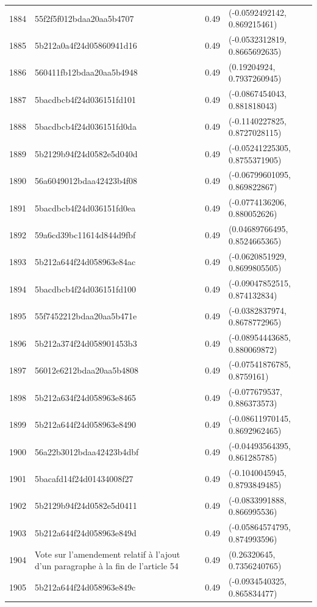 \begin{table}[ht]
\begin{tabular}{rlrl}
  1884 & 55f2f5f012bdaa20aa5b4707 & 0.49 & (-0.0592492142, 0.869215461) \\ 
  1885 & 5b212a0a4f24d05860941d16 & 0.49 & (-0.0532312819, 0.8665692635) \\ 
  1886 & 560411fb12bdaa20aa5b4948 & 0.49 & (0.19204924, 0.7937260945) \\ 
  1887 & 5bacdbcb4f24d036151fd101 & 0.49 & (-0.0867454043, 0.881818043) \\ 
  1888 & 5bacdbcb4f24d036151fd0da & 0.49 & (-0.1140227825, 0.8727028115) \\ 
  1889 & 5b2129b94f24d0582e5d040d & 0.49 & (-0.05241225305, 0.8755371905) \\ 
  1890 & 56a6049012bdaa42423b4f08 & 0.49 & (-0.06799601095, 0.869822867) \\ 
  1891 & 5bacdbcb4f24d036151fd0ea & 0.49 & (-0.0774136206, 0.880052626) \\ 
  1892 & 59a6cd39bc11614d844d9fbf & 0.49 & (0.04689766495, 0.8524665365) \\ 
  1893 & 5b212a644f24d058963e84ac & 0.49 & (-0.0620851929, 0.8699805505) \\ 
  1894 & 5bacdbcb4f24d036151fd100 & 0.49 & (-0.09047852515, 0.874132834) \\ 
  1895 & 55f7452212bdaa20aa5b471e & 0.49 & (-0.0382837974, 0.8678772965) \\ 
  1896 & 5b212a374f24d058901453b3 & 0.49 & (-0.08954443685, 0.880069872) \\ 
  1897 & 56012e6212bdaa20aa5b4808 & 0.49 & (-0.07541876785, 0.8759161) \\ 
  1898 & 5b212a634f24d058963e8465 & 0.49 & (-0.077679537, 0.886373573) \\ 
  1899 & 5b212a644f24d058963e8490 & 0.49 & (-0.08611970145, 0.8692962465) \\ 
  1900 & 56a22b3012bdaa42423b4dbf & 0.49 & (-0.04493564395, 0.861285785) \\ 
  1901 & 5bacafd14f24d01434008f27 & 0.49 & (-0.1040045945, 0.8793849485) \\ 
  1902 & 5b2129b94f24d0582e5d0411 & 0.49 & (-0.0833991888, 0.866995536) \\ 
  1903 & 5b212a644f24d058963e849d & 0.49 & (-0.05864574795, 0.874993596) \\ 
  1904 & Vote sur l'amendement relatif à l'ajout d'un paragraphe à la fin de l'article 54 & 0.49 & (0.26320645, 0.7356240765) \\ 
  1905 & 5b212a644f24d058963e849c & 0.49 & (-0.0934540325, 0.865834477) \\ 

\end{tabular}
\end{table}

